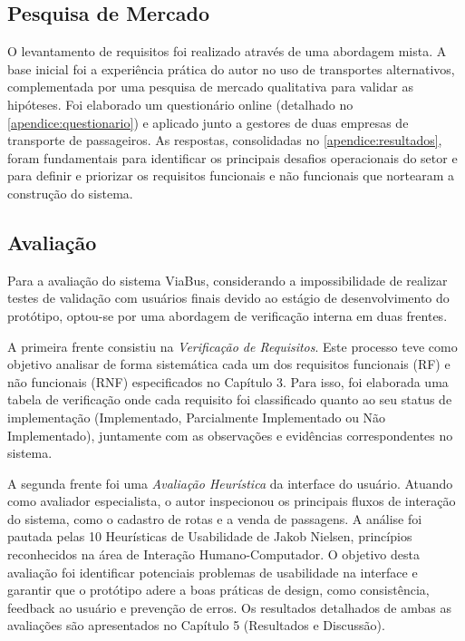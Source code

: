\subsection{Pesquisa de Mercado}

O levantamento de requisitos foi realizado através de uma abordagem mista. A base inicial foi a experiência prática do autor no uso de transportes alternativos, complementada por uma pesquisa de mercado qualitativa para validar as hipóteses. Foi elaborado um questionário online (detalhado no \autoref{apendice:questionario}) e aplicado junto a gestores de duas empresas de transporte de passageiros. As respostas, consolidadas no \autoref{apendice:resultados}, foram fundamentais para identificar os principais desafios operacionais do setor e para definir e priorizar os requisitos funcionais e não funcionais que nortearam a construção do sistema.

\subsection{Avaliação}

Para a avaliação do sistema ViaBus, considerando a impossibilidade de realizar testes de validação com usuários finais devido ao estágio de desenvolvimento do protótipo, optou-se por uma abordagem de verificação interna em duas frentes.

A primeira frente consistiu na \textit{Verificação de Requisitos}. Este processo teve como objetivo analisar de forma sistemática cada um dos requisitos funcionais (RF) e não funcionais (RNF) especificados no Capítulo 3. Para isso, foi elaborada uma tabela de verificação onde cada requisito foi classificado quanto ao seu status de implementação (Implementado, Parcialmente Implementado ou Não Implementado), juntamente com as observações e evidências correspondentes no sistema.

A segunda frente foi uma \textit{Avaliação Heurística} da interface do usuário. Atuando como avaliador especialista, o autor inspecionou os principais fluxos de interação do sistema, como o cadastro de rotas e a venda de passagens. A análise foi pautada pelas 10 Heurísticas de Usabilidade de Jakob Nielsen, princípios reconhecidos na área de Interação Humano-Computador. O objetivo desta avaliação foi identificar potenciais problemas de usabilidade na interface e garantir que o protótipo adere a boas práticas de design, como consistência, feedback ao usuário e prevenção de erros. Os resultados detalhados de ambas as avaliações são apresentados no Capítulo 5 (Resultados e Discussão).